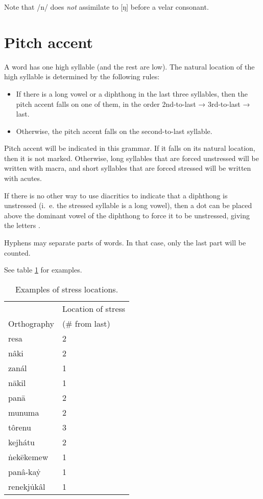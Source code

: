 \documentclass{book}
\begin{document}
Note that /n/ does \emph{not} assimilate to [ŋ] before a velar consonant.

\section{Pitch accent}

A word has one high syllable (and the rest are low). The natural location of the high syllable is determined by the following rules:

\begin{itemize}
    \item If there is a long vowel or a diphthong in the last three syllables, then the pitch accent falls on one of them, in the order 2nd-to-last → 3rd-to-last → last.
    \item Otherwise, the pitch accent falls on the second-to-last syllable.
\end{itemize}

Pitch accent will be indicated in this grammar. If it falls on its natural location, then it is not marked. Otherwise, long syllables that are forced unstressed will be written with macra, and short syllables that are forced stressed will be written with acutes.

If there is no other way to use diacritics to indicate that a diphthong is unstressed (i.~e. the stressed syllable is a long vowel), then a dot can be placed above the dominant vowel of the diphthong to force it to be unstressed, giving the letters .

Hyphens may separate parts of words. In that case, only the last part will be counted.

See table \ref{table:stress} for examples.

\begin{table}[ht]
    \caption{Examples of stress locations. \label{table:stress}}
    \centering
    \begin{tabular}{|l|l|}
        \hline
        & Location of stress \\
        Orthography & (\# from last) \\
        \hline
        resa & 2 \\
        nâki & 2 \\
        zanál & 1 \\
        nākil & 1 \\
        panā & 2 \\
        munuma & 2 \\
        tôrenu & 3 \\
        kejhátu & 2 \\
        ṅekēkemew & 1 \\
        panâ-kaẏ & 1 \\
        renekju̇kâl & 1 \\
        \hline
    \end{tabular}
\end{table}
\end{document}
